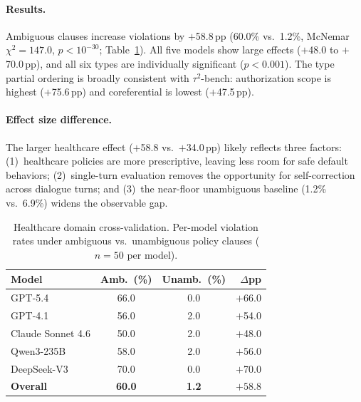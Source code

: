 \paragraph{Results.} Ambiguous clauses increase violations by $+$58.8\,pp (60.0\% vs.\ 1.2\%, McNemar $\chi^2 = 147.0$, $p < 10^{-30}$; Table~\ref{tab:healthcare}). All five models show large effects ($+$48.0 to $+$70.0\,pp), and all six types are individually significant ($p < 0.001$). The type partial ordering is broadly consistent with $\tau^2$-bench: authorization scope is highest ($+$75.6\,pp) and coreferential is lowest ($+$47.5\,pp).

\paragraph{Effect size difference.} The larger healthcare effect ($+$58.8 vs.\ $+$34.0\,pp) likely reflects three factors: (1)~healthcare policies are more prescriptive, leaving less room for safe default behaviors; (2)~single-turn evaluation removes the opportunity for self-correction across dialogue turns; and (3)~the near-floor unambiguous baseline (1.2\% vs.\ 6.9\%) widens the observable gap.

\begin{table}[h]
\centering
\small
\caption{Healthcare domain cross-validation. Per-model violation rates under ambiguous vs.\ unambiguous policy clauses ($n = 50$ per model).}
\label{tab:healthcare}
\begin{tabular}{lccr}
\toprule
Model & Amb.\ (\%) & Unamb.\ (\%) & $\Delta$pp \\
\midrule
GPT-5.4 & 66.0 & 0.0 & $+$66.0 \\
GPT-4.1 & 56.0 & 2.0 & $+$54.0 \\
Claude Sonnet 4.6 & 50.0 & 2.0 & $+$48.0 \\
Qwen3-235B & 58.0 & 2.0 & $+$56.0 \\
DeepSeek-V3 & 70.0 & 0.0 & $+$70.0 \\
\midrule
\textbf{Overall} & \textbf{60.0} & \textbf{1.2} & $\mathbf{+58.8}$ \\
\bottomrule
\end{tabular}
\end{table}

